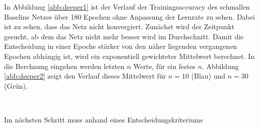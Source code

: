 In Abbildung \ref{abb:deeper1} ist der Verlauf der Trainingsaccuracy des schmallen Baseline Netzes über 180 Epochen ohne Anpassung der Lernrate zu sehen. Dabei ist zu sehen, dass das Netz nicht konvergiert. Zunächst wird der Zeitpunkt gesucht, ab dem das Netz nicht mehr besser wird im Durchschnitt. Damit die Entscheidung in einer Epoche stärker von den näher liegenden vergangenen Epochen abhängig ist, wird ein exponentiell gewichteter Mittelwert berechnet. In die Berchnung eingehen werden letzten $n$ Werte, für ein festes $n$.
Abbildung \ref{abb:deeper2} zeigt den Verlauf dieses Mittelwert für $n=10$ (Blau) und $n=30$ (Grün).
\begin{figure}
     \centering
     \hfill
     \\
     \caption{}
     \label{abb:memory}
\end{figure}
Im nächsten Schritt muss anhand eines Entscheidungskriteriums 


\color{black}
